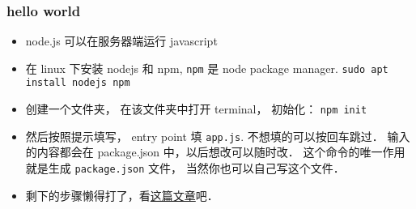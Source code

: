 
\begin{issues}
\issueDraft
\end{issues}


\subsubsection{hello world}
\begin{itemize}
\item node.js 可以在服务器端运行 javascript
\item 在 linux 下安装 nodejs 和 npm, \verb`npm` 是 node package manager. \verb|sudo apt install nodejs npm|
\item 创建一个文件夹， 在该文件夹中打开 terminal， 初始化： \verb|npm init|
\item 然后按照提示填写， entry point 填 \verb`app.js`. 不想填的可以按回车跳过． 输入的内容都会在 package.json 中，以后想改可以随时改． 这个命令的唯一作用就是生成 \verb`package.json` 文件， 当然你也可以自己写这个文件．
\item 剩下的步骤懒得打了，看\href{https://medium.com/@adnanrahic/hello-world-app-with-node-js-and-express-c1eb7cfa8a30}{这篇文章}吧．
\end{itemize}
